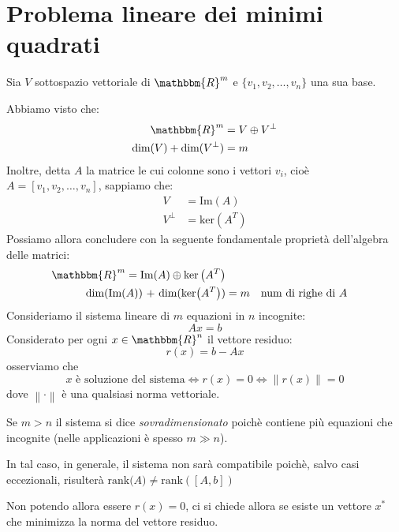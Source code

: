 \documentclass[12pt]{report}
\begin{document}
\chapter{Problema lineare dei minimi quadrati}
Sia $V$ sottospazio vettoriale di $\mathbbm{R}^m$ e $\{v_1, v_2, \dots, v_n\}$ una sua base.

Abbiamo visto che:
\begin{align*}
\mathbbm{R}^m &= V \oplus V^\perp \\
\text{dim}(V) + \text{dim}(V^\perp) &= m
\end{align*}
Inoltre, detta $A$ la matrice le cui colonne sono i vettori $v_i$, cioè $A = [v_1, v_2, \dots, v_n]$, sappiamo che:
\begin{align*}
	V &= \text{Im}(A) \\
	V^\perp &= \text{ker}\left(A^T\right)
\end{align*}
Possiamo allora concludere con la seguente fondamentale proprietà dell'algebra delle matrici:
\begin{align*}
	\mathbbm{R}^m = \text{Im}(A) \oplus \text{ker}\left(A^T\right) \\
	\text{dim(Im($A$)) + dim(ker$\left(A^T\right)$)} &= m \quad \text{num di righe di $A$}
\end{align*}
Consideriamo il sistema lineare di $m$ equazioni in $n$ incognite:
\[
Ax = b
\]
Considerato per ogni $x\in\mathbbm{R}^n$ il vettore residuo:
\[
r(x) = b - Ax
\]
osserviamo che
\[
x \text{ è soluzione del sistema} \iff r(x) = 0 \iff \left\| r(x) \right\| = 0
\]
dove $\left\|\cdot\right\|$ è una qualsiasi norma vettoriale.

Se $m > n$ il sistema si dice \textit{sovradimensionato} poichè contiene più equazioni che incognite (nelle applicazioni è spesso $m \gg n$).

In tal caso, in generale, il sistema non sarà compatibile poichè, salvo casi eccezionali, risulterà $\text{rank($A$)} \neq \text{rank}\left([A, b]\right)$

Non potendo allora essere $r(x) = 0$, ci si chiede allora se esiste un vettore $x^*$ che minimizza la norma del vettore residuo.
\end{document}
